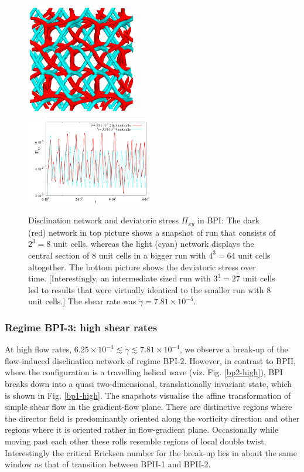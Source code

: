 \documentclass[aps,pre,reprint,superscriptaddress, twocolumn]{revtex4}
\newcommand{\e}[1]{\times10^{#1}}
\newcommand{\gd}{\dot{\gamma}}
\begin{document}
\begin{figure}[htpb]
\includegraphics[width=0.43\textwidth]{disc+y-600k-run911_run1163.png}\\
\includegraphics[width=0.495\textwidth]{stress_bp1_2uc_4uc.pdf}
\caption{Disclination network and deviatoric stress $\Pi_{xy}$ in BPI: 
The dark (red) network in top picture shows a snapshot of run that consists 
of $2^3=8$ unit cells, whereas the light (cyan) network displays the 
central section of 8 unit cells in a bigger run with $4^3=64$ unit cells altogether. 
The bottom picture shows the deviatoric stress over time. [Interestingly, 
an intermediate sized run with $3^3=27$ unit cells led to results that 
were virtually identical to the smaller run with 8 unit cells.] 
The shear rate was $\gd=7.81\e{-5}$.
}
\label{bp1-2uc4uc}
\end{figure}

\subsubsection{Regime BPI-3: high shear rates}

At high flow rates, $6.25\e{-4}\lesssim\gd\lesssim7.81\e{-4}$, 
we observe a break-up of the flow-induced 
disclination network of regime BPI-2. However, 
in contrast to BPII, where the configuration is a travelling helical 
wave (viz. Fig. \ref{bp2-high}), BPI breaks down into a quasi 
two-dimensional, translationally invariant state, which is shown in 
Fig. \ref{bp1-high}. The snapshots visualise the affine 
transformation of simple shear flow in the gradient-flow plane.
There are distinctive regions where the director field is 
predominantly oriented along the vorticity direction and 
other regions where it is oriented rather in flow-gradient plane. 
Occasionally while moving past each other these rolls resemble 
regions of local double twist.
Interestingly the critical Ericksen number for the break-up lies in 
about the same window as that of transition between BPII-1 and BPII-2. 
\end{document}
